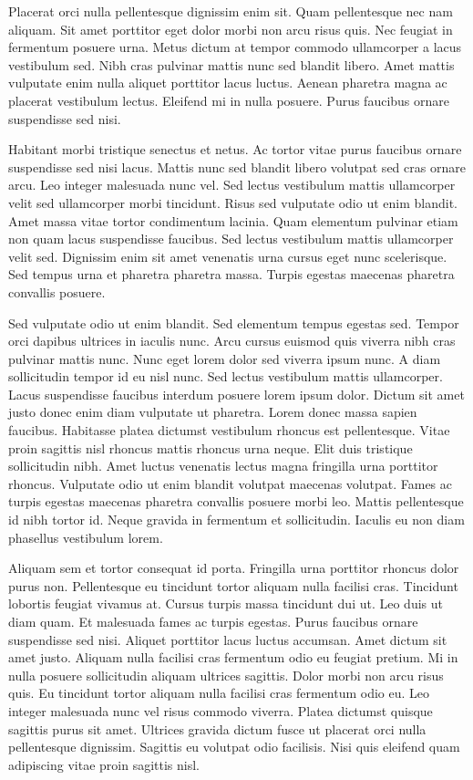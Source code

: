 \documentclass[conference]{IEEEtran}
\begin{document}
Placerat orci nulla pellentesque dignissim enim sit. Quam pellentesque nec nam aliquam. Sit amet porttitor eget dolor morbi non arcu risus quis. Nec feugiat in fermentum posuere urna. Metus dictum at tempor commodo ullamcorper a lacus vestibulum sed. Nibh cras pulvinar mattis nunc sed blandit libero. Amet mattis vulputate enim nulla aliquet porttitor lacus luctus. Aenean pharetra magna ac placerat vestibulum lectus. Eleifend mi in nulla posuere. Purus faucibus ornare suspendisse sed nisi.

Habitant morbi tristique senectus et netus. Ac tortor vitae purus faucibus ornare suspendisse sed nisi lacus. Mattis nunc sed blandit libero volutpat sed cras ornare arcu. Leo integer malesuada nunc vel. Sed lectus vestibulum mattis ullamcorper velit sed ullamcorper morbi tincidunt. Risus sed vulputate odio ut enim blandit. Amet massa vitae tortor condimentum lacinia. Quam elementum pulvinar etiam non quam lacus suspendisse faucibus. Sed lectus vestibulum mattis ullamcorper velit sed. Dignissim enim sit amet venenatis urna cursus eget nunc scelerisque. Sed tempus urna et pharetra pharetra massa. Turpis egestas maecenas pharetra convallis posuere.

Sed vulputate odio ut enim blandit. Sed elementum tempus egestas sed. Tempor orci dapibus ultrices in iaculis nunc. Arcu cursus euismod quis viverra nibh cras pulvinar mattis nunc. Nunc eget lorem dolor sed viverra ipsum nunc. A diam sollicitudin tempor id eu nisl nunc. Sed lectus vestibulum mattis ullamcorper. Lacus suspendisse faucibus interdum posuere lorem ipsum dolor. Dictum sit amet justo donec enim diam vulputate ut pharetra. Lorem donec massa sapien faucibus. Habitasse platea dictumst vestibulum rhoncus est pellentesque. Vitae proin sagittis nisl rhoncus mattis rhoncus urna neque. Elit duis tristique sollicitudin nibh. Amet luctus venenatis lectus magna fringilla urna porttitor rhoncus. Vulputate odio ut enim blandit volutpat maecenas volutpat. Fames ac turpis egestas maecenas pharetra convallis posuere morbi leo. Mattis pellentesque id nibh tortor id. Neque gravida in fermentum et sollicitudin. Iaculis eu non diam phasellus vestibulum lorem.

Aliquam sem et tortor consequat id porta. Fringilla urna porttitor rhoncus dolor purus non. Pellentesque eu tincidunt tortor aliquam nulla facilisi cras. Tincidunt lobortis feugiat vivamus at. Cursus turpis massa tincidunt dui ut. Leo duis ut diam quam. Et malesuada fames ac turpis egestas. Purus faucibus ornare suspendisse sed nisi. Aliquet porttitor lacus luctus accumsan. Amet dictum sit amet justo. Aliquam nulla facilisi cras fermentum odio eu feugiat pretium. Mi in nulla posuere sollicitudin aliquam ultrices sagittis. Dolor morbi non arcu risus quis. Eu tincidunt tortor aliquam nulla facilisi cras fermentum odio eu. Leo integer malesuada nunc vel risus commodo viverra. Platea dictumst quisque sagittis purus sit amet. Ultrices gravida dictum fusce ut placerat orci nulla pellentesque dignissim. Sagittis eu volutpat odio facilisis. Nisi quis eleifend quam adipiscing vitae proin sagittis nisl.
\end{document}
